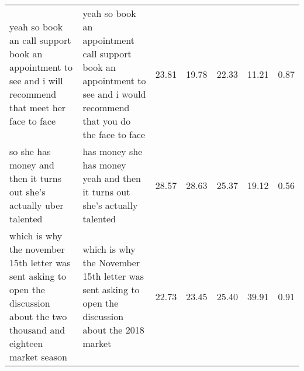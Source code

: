 \begin{table*}[ht!]
\begin{tabular}{p{5cm}p{5cm}p{1cm}p{1cm}p{1cm}p{1cm}p{1cm}}
yeah so book an call support book an appointment to see and i will recommend that meet her face to face                                                                                                                                                                                            & yeah so book an appointment call support book an appointment to see and i would recommend that you do the face to face                                                                                                                                                                               & 23.81    & 19.78 & 22.33  & 11.21 & 0.87       \\
so she has money and then it turns out she's actually uber talented                                                                                                                                                                                                                                & has money she has money yeah and then it turns out she's actually talented                                                                                                                                                                                                                           & 28.57    & 28.63 & 25.37  & 19.12 & 0.56       \\
which is why the november 15th letter was sent asking to open the discussion about the two thousand and eighteen market season                                                                                                                                                                     & which is why the November 15th letter was sent asking to open the discussion about the 2018 market                                                                                                                                                                                                   & 22.73    & 23.45 & 25.40  & 39.91 & 0.91       \\

\end{tabular}
\end{table*}
